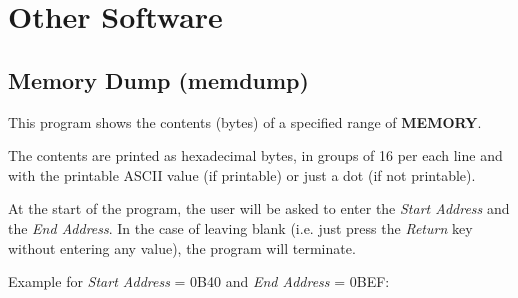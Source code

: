 \section{Other Software}

    \subsection{Memory Dump (memdump)}
    \label{software:memdump}

    This program shows the contents (bytes) of a specified range of
    \textbf{MEMORY}.

    The contents are printed as hexadecimal bytes, in groups of 16 per each line
    and with the printable ASCII value (if printable) or just a dot (if not
    printable).

    At the start of the program, the user will be asked to enter the
    \textit{Start Address} and the \textit{End Address}. In the case of leaving
    blank (i.e. just press the \textit{Return} key without entering any value),
    the program will terminate.

    Example for \textit{Start Address} = 0B40 and \textit{End Address} = 0BEF:

